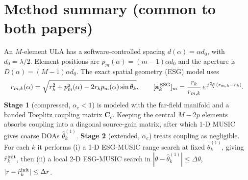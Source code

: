 \documentclass[11pt,a4paper]{article}
\begin{document}
\section{Method summary (common to both papers)}
An $M$-element ULA has a software-controlled spacing $d(\alpha)=\alpha d_0$, with $d_0=\lambda/2$.
Element positions are $p_m(\alpha)=(m-1)\alpha d_0$ and the aperture is $D(\alpha)=(M-1)\alpha d_0$.
The exact spatial geometry (ESG) model uses
\begin{equation}
r_{m,k}(\alpha)=\sqrt{r_k^2+p_m^2(\alpha)-2r_kp_m(\alpha)\sin\theta_k},\qquad
[\mathbf a^{\rm ESG}_k]_m=\frac{r_k}{r_{m,k}}\,e^{\,j\frac{2\pi}{\lambda}(r_{m,k}-r_k)} .
\end{equation}
\textbf{Stage 1} (compressed, $\alpha_c<1$) is modeled with the far-field manifold and a banded
Toeplitz coupling matrix $\mathbf C_c$. Keeping the central $M-2p$ elements absorbs coupling
into a diagonal source-gain matrix, after which 1-D MUSIC gives coarse DOAs $\hat\theta^{(1)}_k$.
\textbf{Stage 2} (extended, $\alpha_e$) treats coupling as negligible. For each $k$ it performs
(i) a 1-D ESG-MUSIC range search at fixed $\hat\theta^{(1)}_k$, giving $\hat r^{\rm init}_k$, then
(ii) a local 2-D ESG-MUSIC search in $|\theta-\hat\theta^{(1)}_k|\le\Delta\theta$,
$|r-\hat r^{\rm init}_k|\le\Delta r$.

\end{document}
